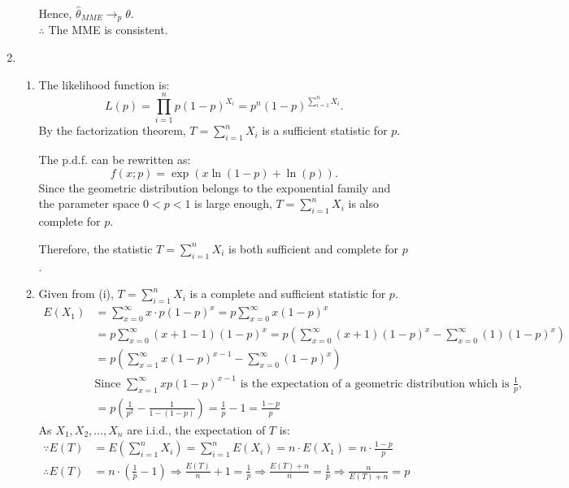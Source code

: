 \documentclass{article}
\begin{document}
\begin{enumerate}
\begin{enumerate}[label=(\roman*)]
    Hence, $\hat{\theta}_{MME} \to_p \theta$. \\
    $\therefore$ The MME is consistent.

    \end{enumerate}

\item
    \begin{enumerate}[label=(\roman*)]
    \item The likelihood function is:
    \[
    L(p) = \prod_{i=1}^{n} p(1 - p)^{X_i} = p^n (1 - p)^{\sum_{i=1}^{n} X_i}.
    \]
    By the factorization theorem, $T = \sum_{i=1}^{n} X_i$ is a sufficient statistic for $p$.

    The p.d.f. can be rewritten as:
    \[
    f(x; p) = \exp\left( x \ln(1 - p) + \ln(p) \right).
    \]
    Since the geometric distribution belongs to the exponential family and the parameter space \(0 < p < 1\) is large enough, \(T = \sum_{i=1}^n X_i\) is also complete for \(p\).

    Therefore, the statistic \(T = \sum_{i=1}^n X_i\) is both sufficient and complete for \(p\).

    \item

    Given from (i), \( T = \sum_{i=1}^{n} X_i \) is a complete and sufficient statistic for \( p \).
    \begin{align*}
        E(X_1) &= \sum_{x=0}^{\infty} x \cdot p(1-p)^x = p \sum_{x=0}^{\infty} x(1-p)^x \\
        &= p \sum_{x=0}^{\infty} (x+1-1)(1-p)^x = p \left( \sum_{x=0}^{\infty} (x+1)(1-p)^x - \sum_{x=0}^{\infty} (1)(1-p)^x \right) \\
        &= p \left( \sum_{x=1}^{\infty} x(1-p)^{x-1} - \sum_{x=0}^{\infty} (1-p)^x \right) \\
        & \text{Since } \sum_{x=1}^{\infty} xp(1-p)^{x-1} \text{ is the expectation of a geometric distribution which is } \frac{1}{p}, \\
        &= p ( \frac{1}{p^2} - \frac{1}{1-(1-p)} ) = \frac{1}{p} - 1 = \frac{1-p}{p}
    \end{align*}
    As $X_1, X_2, \dots, X_n$ are i.i.d., the expectation of \( T \) is:
    \begin{align*}
    \because E(T) &= E\left( \sum_{i=1}^{n} X_i \right) = \sum_{i=1}^{n} E(X_i) = n \cdot E(X_1) = n \cdot \frac{1 - p}{p} \\
    \therefore E(T) &= n \cdot (\frac{1}{p} - 1) \Rightarrow \frac{E(T)}{n}+1 = \frac{1}{p} \Rightarrow \frac{E(T)+n}{n} = \frac{1}{p} \Rightarrow \frac{n}{E(T)+n} = p
    \end{align*}


\end{enumerate}
\end{enumerate}
\end{document}
